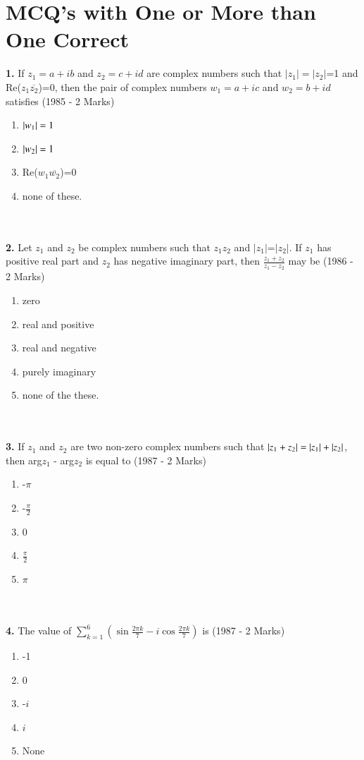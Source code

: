 \documentclass[journal,12pt,twocolumn]{IEEEtran}
\theoremstyle{remark}
\begin{document}
\section{ MCQ's with One or More than One Correct}
\textbf{1.} If $z_{1}=a+ib$ and $z_{2}=c+id$ are complex numbers such that $|z_{1}|=|z_{2}|$=1 and Re($z_{1}\overline{z_{2}}$)=0, then the pair of complex numbers $w_{1}=a+ic$ and $w_{2}=b+id$ satisfies \hfill{(1985 - 2 Marks)}
\begin{enumerate}[label=(\alph*)]
	\item $\left\vert w_{1}\right\vert=1$
	\item $\left\vert w_{2}\right\vert=1$
	\item Re($w_{1}\overline{w_{2}}$)=0
	\item none of these.
\end{enumerate}
\\\\
\textbf{2.} Let $z_{1}$ and $z_{2}$ be complex numbers such that $z_{1}$\neq$z_{2}$ and $|z_{1}|$=$|z_{2}|$. If $z_{1}$ has positive real part and $z_{2}$ has negative imaginary part, then $\frac{z_{1}+z_{2}}{z_{1}-z_{2}}$ may be \hfill{(1986 - 2 Marks)}
\begin{enumerate}[label=(\alph*)]
	\item zero
	\item real and positive
	\item real and negative
	\item purely imaginary
	\item none of the these.
\end{enumerate}
\\\\
\textbf{3.} If $z_{1}$ and $z_{2}$ are two non-zero complex numbers such that $\left\vert z_{1}+z_{2}\right\vert=\left\vert z_{1}\right\vert+\left\vert z_{2}\right\vert$, then arg$z_{1}$ - arg$z_{2}$ is equal to \hfill{(1987 - 2 Marks)}
\begin{enumerate}[label=(\alph*)]
	\item -$\pi$
	\item -$\frac{\pi}{2}$
        \item 0
        \item $\frac{\pi}{2}$
	\item $\pi$
\end{enumerate}
\\\\
\textbf{4.} The value of $\sum_{k=1} ^{6} (\sin \frac{2\pi k}{7}-i\cos \frac{2\pi k}{7})$ is \hfill{(1987 - 2 Marks)}
\begin{enumerate}[label=(\alph*)]
	
	\item -1
	\item 0
	\item -$i$
	\item $i$
	\item None
\end{enumerate}



\renewcommand{\thefigure}{\theenumi}
\renewcommand{\thetable}{\theenumi}
\end{document}
